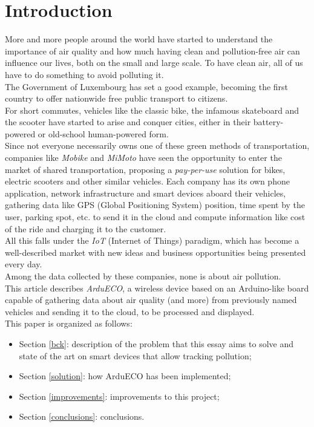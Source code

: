 \documentclass[conference]{IEEEtran}
\begin{document}
\section{Introduction}\label{intro}
	More and more people around the world have started to understand the importance of air quality and how much having clean and pollution-free air can influence our lives, both on the small and large scale. 
	To have clean air, all of us have to do something to avoid polluting it. \\
	The Government of Luxembourg has set a good example, becoming the first country to offer nationwide free public transport to citizens\cite{luxemburg}.\\
	For short commutes, vehicles like the classic bike\cite{bike}, the infamous skateboard and the scooter have started to arise and conquer cities, either in their battery-powered or old-school human-powered form.\\
	Since not everyone necessarily owns one of these green methods of transportation, companies like \textit{Mobike}\cite{mobike} and \textit{MiMoto}\cite{mimoto} have seen the opportunity to enter the market of shared transportation, proposing a \textit{pay-per-use} solution for bikes, electric scooters and other similar vehicles.	
	Each company has its own phone application, network infrastructure and smart devices aboard their vehicles, gathering data like GPS (Global Positioning System) position, time spent by the user, parking spot, etc. to send it in the cloud and compute information like cost of the ride and charging it to the customer.\\
	All this falls under the \textit{IoT} (Internet of Things) paradigm, which has become a well-described market with new ideas and business opportunities being presented every day.\\
	Among the data collected by these companies, none is about air pollution.\\
	This article describes \textit{ArduECO}, a wireless device based on an Arduino-like board capable of gathering data about air quality (and more) from previously named vehicles and sending it to the cloud, to be processed and displayed.\\
	This paper is organized as follows:
	\begin{itemize}
		\item Section \ref{bck}: description of the problem that this essay aims to solve and state of the art on smart devices that allow tracking pollution;
		\item Section \ref{solution}: how ArduECO has been implemented;
		\item Section \ref{improvements}: improvements to this project;
		\item Section \ref{conclusions}: conclusions.
	\end{itemize}
\end{document}
